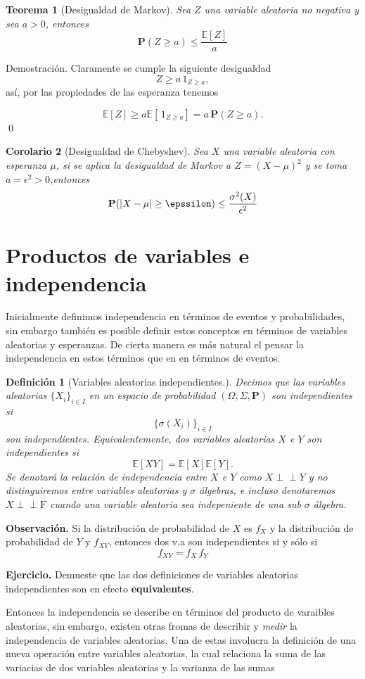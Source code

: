 \documentclass[letterpaper]{book}
\newcommand{\ind}{\perp\!\!\!\!\perp}
\newtheorem{teorema}{Teorema}[section]
\newtheorem{cor}[teorema]{Corolario}
\newtheorem{def.}{Definici\'on}[section]
\newcommand{\prob}{\textbf{P}}
\newcommand{\esp}{\mathbb E}
\newcommand{\eje}{{\newline \noindent \sc \textbf{Ejercicio. }}}
\newcommand{\obs}{{\newline \noindent \sc \textbf{Observación. }}}
\newcommand{\dem}{{\noindent \sc Demostraci\'on. }}
\newcommand{\om}{\ensuremath{\Omega}}
\newcommand{\sig}{\ensuremath{\Sigma}}
\begin{document}
\begin{teorema}[Desigualdad de Markov]
Sea $Z$ una variable aleatoria no negativa y sea $a>0$, entonces
\[
\prob(Z\geq a)\leq\frac{\esp[Z]}{a}
\]
\end{teorema}
\dem Claramente se cumple la siguiente desigualdad
\[
Z\geq a\,1_{Z\geq a},
\]
\noindent así, por las propiedades de las esperanza tenemos

\[
\esp[Z]\geq a\esp[\,1_{Z\geq a}]=a\,\prob(Z\geq a).
\]
\qed
\begin{cor}[Desigualdad de Chebyshev]
Sea $X$ una variable aleatoria con esperanza $\mu$, si se aplica la desigualdad de Markov a $Z=(X-\mu)^2$ y se toma $a=\epsilon^2>0$,entonces
\[
\prob(|X-\mu|\geq \epssilon)\leq \frac{\sigma^2(X)}{\epsilon^2}
\]
\end{cor}

\section{Productos de variables e independencia}
\label{sec:org4eed25f}
\noindent Inicialmente definimos independencia en términos de eventos y probabilidades, sin embargo también es posible definir estos conceptos en términos de variables aleatorias y esperanzas. De cierta manera es más natural el pensar la independencia en estos términos que en en términos de eventos. 

\begin{def.}[Variables aleatorias independientes.]
Decimos que las variables aleatorias \(\{X_i\}_{i\in I}\) en un espacio de probabilidad \((\om,\sig,\prob)\) son \emph{independientes} si \[\{\sigma(X_i)\}_{i\in I}\] son independientes. Equivalentemente, dos variables aleatorias \(X\) e \(Y\) son independientes si 
\[
\esp[XY]=\esp[X]\esp[Y].
\]
Se denotará la relación de independencia entre \(X\) e \(Y\) como \(X\ind Y\) y no distinguiremos entre variables aleatorias y \(\sigma\) álgebras, e incluso denotaremos \(X\ind\mathrm{F}\) cuando una variable aleatoria sea indepeniente de una sub \(\sigma\) álgebra.
\end{def.}

\obs Si la distribución de probabilidad de \(X\) es \(f_X\) y la distribución de probabilidad de \(Y\) y \(f_{XY}\), entonces dos v.a son independientes si y sólo si
\[
f_{XY}=f_X\,f_Y
\]

\eje Demueste que las dos definiciones de variables aleatorias independientes son en efecto \textbf{equivalentes}.

Entonces la independencia se describe en términos del producto de varaibles aleatorias, sin embargo, existen otras fromas de describir y \emph{medir} la independencia de variables aleatorias. Una de estas involucra la definición de una nueva operación entre variables aleatorias, la cual relaciona la suma de las variacias de dos variables aleatorias y la varianza de las sumas
\end{document}
